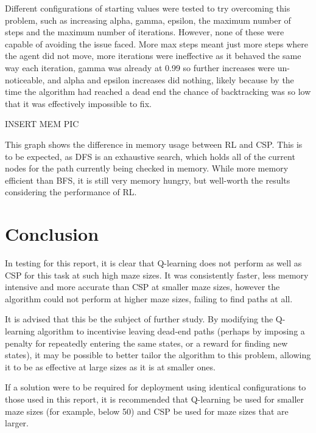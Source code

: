 \documentclass{article}
\begin{document}
         Different configurations of starting values were tested to try overcoming this problem, such as increasing alpha,
         gamma, epsilon, the maximum number of steps and the maximum number of iterations. However, none of these were
         capable of avoiding the issue faced. More max steps meant just more steps where the agent did not move, more
         iterations were ineffective as it behaved the same way each iteration, gamma was already at 0.99 so further
         increases were un-noticeable, and alpha and epsilon increases did nothing, likely because by the time the
         algorithm had reached a dead end the chance of backtracking was so low that it was effectively impossible to fix.

         INSERT MEM PIC

         This graph shows the difference in memory usage between RL and CSP. This is to be expected, as DFS is an exhaustive
         search, which holds all of the current nodes for the path currently being checked in memory. While more memory
         efficient than BFS, it is still very memory hungry, but well-worth the results considering the performance of RL.

    \section{Conclusion}\label{sec:conclusion}

        In testing for this report, it is clear that Q-learning does not perform as well as CSP for this task at such
        high maze sizes. It was consistently faster, less memory intensive and more accurate than CSP at smaller maze sizes,
        however the algorithm could not perform at higher maze sizes, failing to find paths at all.

        It is advised that this be the subject of further study. By modifying the Q-learning algorithm to incentivise
        leaving dead-end paths (perhaps by imposing a penalty for repeatedly entering the same states, or a reward for
        finding new states), it may be possible to better tailor the algorithm to this problem, allowing it to be as
        effective at large sizes as it is at smaller ones.

        If a solution were to be required for deployment using identical configurations to those used in this report,
        it is recommended that Q-learning be used for smaller maze sizes (for example, below 50) and CSP be used for
        maze sizes that are larger.


    
    
\end{document}
